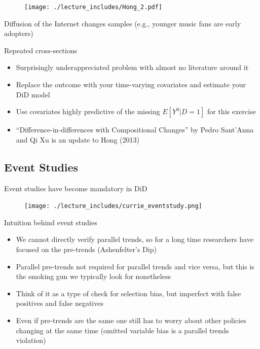 \documentclass{beamer}
\begin{document}
\begin{frame}[shrink=20,plain]
	\begin{figure}
	\texttt{[image: ./lecture\_includes/Hong\_2.pdf]}
	\end{figure}
	
	Diffusion of the Internet changes samples (e.g., younger music fans are early adopters)
	
\end{frame}

\begin{frame}{Repeated cross-sections}

\begin{itemize}
\item Surprisingly underappreciated problem with almost no literature around it
\item Replace the outcome with your time-varying covariates and estimate your DiD model
\item Use covariates highly predictive of the missing $E[Y^0|D=1]$ for this exercise
\item ``Difference-in-differences with Compositional Changes'' by Pedro Sant'Anna and Qi Xu is an update to Hong (2013)
\end{itemize}

\end{frame}


\subsection{Event Studies}



\begin{frame}{Event studies have become mandatory in DiD}

	\begin{figure}
	\texttt{[image: ./lecture\_includes/currie\_eventstudy.png]}
	\end{figure}

\end{frame}

\begin{frame}{Intuition behind event studies}

\begin{itemize}

	\item We cannot directly verify parallel trends, so for a long time researchers have focused on the pre-trends (Ashenfelter's Dip)
	\item Parallel pre-trends not required for parallel trends and vice versa, but this is the smoking gun we typically look for nonetheless
	\item Think of it as a type of check for selection bias, but imperfect with false positives and false negatives
	\item Even if pre-trends are the same one still has to worry about other policies changing at the same time (omitted variable bias is a parallel trends violation)

\end{itemize}

\end{frame}
\end{document}
